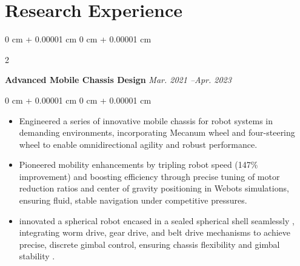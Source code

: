 ﻿\documentclass[10pt, letterpaper]{article}
\newenvironment{highlights}{
    \begin{itemize}[
        topsep=0.10 cm,
        parsep=0.10 cm,
        partopsep=0pt,
        itemsep=0pt,
        leftmargin=0 cm + 10pt
    ]
}{
    \end{itemize}
} %
\newenvironment{onecolentry}{
    \begin{adjustwidth}{
        0 cm + 0.00001 cm
    }{
        0 cm + 0.00001 cm
    }
}{
    \end{adjustwidth}
} %
\newenvironment{twocolentry}[2][]{
    \onecolentry
    \def\secondColumn{#2}
    \setcolumnwidth{\fill, 4.5 cm}
    \begin{paracol}{2}
}{
    \switchcolumn \raggedleft \secondColumn
    \end{paracol}
    \endonecolentry
} %
\begin{document}
\section{Research Experience}

        \begin{twocolentry}{
            \textit{Mar. 2021 --Apr. 2023}
        }
            \textbf{Advanced Mobile Chassis Design}\end{twocolentry}
        \vspace{0.10 cm}
        \begin{onecolentry}
            \begin{highlights}
                \item Engineered a series of innovative mobile chassis for robot systems in demanding environments, incorporating Mecanum wheel and four-steering wheel to enable omnidirectional agility and robust performance.

                \item Pioneered mobility enhancements by tripling robot speed (147\% improvement) and boosting efficiency through precise tuning of motor reduction ratios and center of gravity positioning in Webots simulations, ensuring fluid, stable navigation under competitive pressures.
                
                \item innovated a spherical robot encased in a sealed spherical shell seamlessly , integrating worm drive, gear drive, and belt drive mechanisms to achieve precise, discrete gimbal control, ensuring chassis flexibility and gimbal stability .
                
            \end{highlights}
        \end{onecolentry}
        \vspace{0.2 cm}
\end{document}
